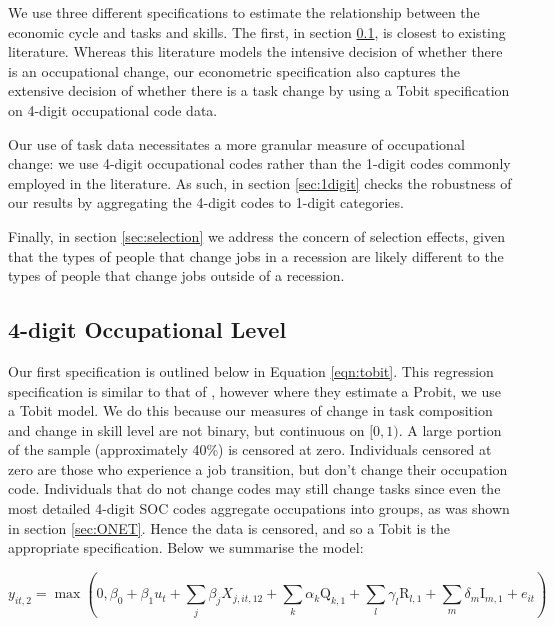 \documentclass[preprint,12pt,authoryear]{elsarticle}
\begin{document}
We use three different specifications to estimate the relationship between the economic cycle and tasks and skills. The first, in section \ref{sec:4digit},  is closest to existing literature. Whereas this literature models the intensive decision of whether there is an occupational change, our econometric specification also captures the extensive decision of whether there is a task change by using a Tobit specification on 4-digit occupational code data.

Our use of task data necessitates a more granular measure of occupational change: we use 4-digit occupational codes rather than the 1-digit codes commonly employed in the literature. As such, in section \ref{sec:1digit}  checks the robustness of our results by aggregating the 4-digit codes to 1-digit categories.

Finally, in section \ref{sec:selection} we address the concern of selection effects, given that the types of people that change jobs in a recession are likely different to the types of people that change jobs outside of a recession. 


\subsection{4-digit Occupational Level}
\label{sec:4digit}
Our first specification is outlined below in Equation \ref{eqn:tobit}. This regression specification is similar to that of \cite{Carrillo-Tudela2016}, however where they estimate a Probit, we use a Tobit model. We do this because our measures of change in task composition and change in skill level are not binary, but continuous on $[0,1)$. A large portion of the sample (approximately 40\%) is censored at zero. Individuals censored at zero are those who experience a job transition, but don't change their occupation code. Individuals that do not change codes may still change tasks since even the most detailed 4-digit SOC codes aggregate occupations into groups, as was shown in section \ref{sec:ONET}. Hence the data is censored, and so a Tobit is the appropriate specification. Below we summarise the model:

\begin{equation}
\label{eqn:tobit}
y_{it,2} =\max(0,\beta_0 + \beta_{1}u_{t} + \sum_{j} \beta_{j}X_{j,it,12} + \sum_{k} \alpha_{k} \text{Q}_{k,1} + \sum_{l} \gamma_{l} \text{R}_{l,1} + \sum_{m} \delta_{m} \text{I}_{m,1}+ e_{it})
\end{equation}
\end{document}
